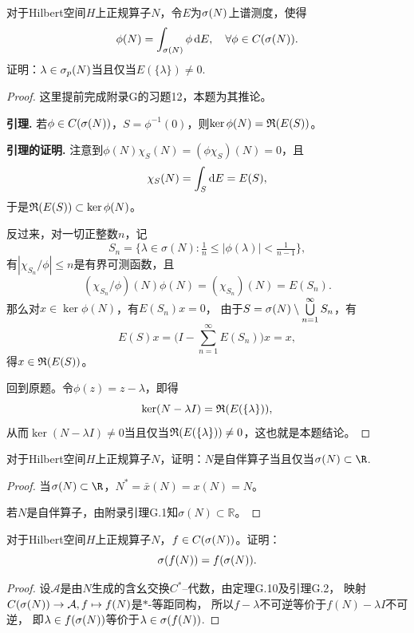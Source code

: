 \begin{6}
对于Hilbert空间$H$上正规算子$N$，令$E$为$\sigma(N)$上谱测度，使得
$$\phi(N)=\int_{\sigma(N)}\phi\,{\rm d}E,\quad\forall\phi\in C(\sigma(N)).$$
证明：$\lambda\in\sigma_p(N)$当且仅当$E(\{\lambda\})\ne0$.
\end{6}
\begin{proof}
这里提前完成附录G的习题12，本题为其推论。

\textbf{引理.} 若$\phi\in C(\sigma(N))$，$S=\phi^{-1}(0)$，则$\ker\phi(N)=\mathfrak{R}(E(S))$。

\textbf{引理的证明.} 注意到$\phi(N)\chi_{S}(N)=(\phi\chi_S)(N)=0$，且
\[\chi_S(N)=\int_{S}{\rm d}E=E(S),\]
于是$\mathfrak{R}(E(S))\subset\ker\phi(N)$。

反过来，对一切正整数$n$，记
\[S_n=\big\{\lambda\in\sigma(N):
\tfrac{1}{n}\leqslant|\phi(\lambda)|<\tfrac{1}{n-1}\big\},\]
有$|\chi_{S_n}/\phi|\leqslant n$是有界可测函数，且
$$(\chi_{S_n}/\phi)(N)\phi(N)=(\chi_{S_n})(N)=E(S_n).$$
那么对$x\in\ker\phi(N)$，有$E(S_n)x=0$，
由于$S=\sigma(N)\setminus\bigcup\limits_{n=1}^{\infty}S_n$，有
$$E(S)x=\Big(I-\sum_{n=1}^\infty E(S_n)\Big)x=x,$$
得$x\in\mathfrak{R}(E(S))$。

回到原题。令$\phi(z)=z-\lambda$，即得
\[\ker(N-\lambda I)=\mathfrak{R}(E(\{\lambda\})),\]
从而$\ker(N-\lambda I)\ne0$当且仅当$\mathfrak{R}(E(\{\lambda\}))\ne0$，这也就是本题结论。
\end{proof}

\begin{7}
对于Hilbert空间$H$上正规算子$N$，证明：$N$是自伴算子当且仅当$\s(N)\subset\R$.
\end{7}
\begin{proof}
当$\s(N)\subset\R$，$N^*=\bar{x}(N)=x(N)=N$。

若$N$是自伴算子，由附录引理G.1知$\sigma(N)\subset \mathbb{R}$。
\end{proof}

\begin{8}
    对于Hilbert空间$H$上正规算子$N$，$f\in C(\sigma(N))$。证明：
    $$\sigma(f(N))=f(\sigma(N)).$$
\end{8}
\begin{proof}
    设$\mathcal{A}$是由$N$生成的含幺交换$C^*$--代数，由定理G.10及引理G.2，
    映射$C(\sigma(N))\to\mathcal{A},f\mapsto f(N)$是$*$-等距同构，
    所以$f-\lambda$不可逆等价于$f(N)-\lambda I$不可逆，
    即$\lambda\in f(\sigma(N))$等价于$\lambda\in\sigma(f(N))$.
\end{proof}

